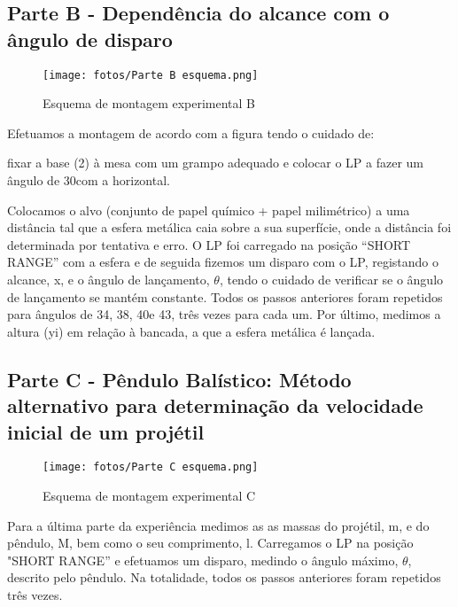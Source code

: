 \documentclass{report}
\begin{document}
\subsection{Parte B - Dependência do alcance com o ângulo de disparo}
\begin{figure}[H]
\centering
\texttt{[image: fotos/Parte B esquema.png]}
\caption{Esquema de montagem experimental B}
\end{figure}
Efetuamos a montagem de acordo com a figura tendo o cuidado de:
\begin{paragrafoenum}
\item  fixar a base (2) à mesa com um grampo adequado e colocar o LP a fazer um ângulo de 30\degree com a horizontal.
\end{paragrafoenum}
Colocamos o alvo (conjunto de papel químico + papel milimétrico) a uma distância tal que a esfera metálica caia sobre a sua superfície, onde a distância foi determinada por tentativa e erro. O LP foi carregado na posição “SHORT RANGE” com a esfera e de seguida fizemos um disparo com o LP, registando o alcance, x, e o ângulo de lançamento, $\theta$, tendo o cuidado de verificar se o ângulo de lançamento se mantém constante. Todos os passos anteriores foram repetidos para ângulos de 34\degree, 38\degree, 40\degree e 43\degree, três vezes para cada um. Por último, medimos a altura (yi) em relação à bancada, a que a esfera metálica é lançada.
\subsection{Parte C - Pêndulo Balístico: Método alternativo para determinação da velocidade inicial de um projétil}
\begin{figure}[H]
\centering
\texttt{[image: fotos/Parte C esquema.png]}
\caption{Esquema de montagem experimental C}
\end{figure}
Para a última parte da experiência medimos as as massas do projétil, m, e do pêndulo, M, bem como o seu comprimento, l. Carregamos o LP na posição "SHORT RANGE” e efetuamos um disparo, medindo o ângulo máximo, $\theta$, descrito pelo pêndulo. Na totalidade, todos os passos anteriores foram repetidos três vezes.
\end{document}
